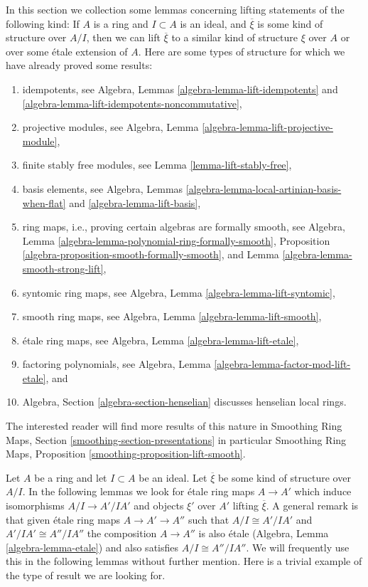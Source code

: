 \noindent
In this section we collection some lemmas concerning lifting
statements of the following kind: If $A$ is a ring and $I \subset A$
is an ideal, and $\overline{\xi}$ is some kind of structure over
$A/I$, then we can lift $\overline{\xi}$ to a similar kind of structure
$\xi$ over $A$ or over some \'etale extension of $A$. Here are some types
of structure for which we have already proved some results:
\begin{enumerate}
\item idempotents, see
Algebra, Lemmas \ref{algebra-lemma-lift-idempotents} and
\ref{algebra-lemma-lift-idempotents-noncommutative},
\item projective modules, see
Algebra, Lemma \ref{algebra-lemma-lift-projective-module},
\item finite stably free modules, see Lemma \ref{lemma-lift-stably-free},
\item basis elements, see
Algebra, Lemmas \ref{algebra-lemma-local-artinian-basis-when-flat} and
\ref{algebra-lemma-lift-basis},
\item ring maps, i.e., proving certain algebras are formally smooth, see
Algebra, Lemma \ref{algebra-lemma-polynomial-ring-formally-smooth},
Proposition \ref{algebra-proposition-smooth-formally-smooth}, and
Lemma \ref{algebra-lemma-smooth-strong-lift},
\item syntomic ring maps, see
Algebra, Lemma \ref{algebra-lemma-lift-syntomic},
\item smooth ring maps, see
Algebra, Lemma \ref{algebra-lemma-lift-smooth},
\item \'etale ring maps, see
Algebra, Lemma \ref{algebra-lemma-lift-etale},
\item factoring polynomials, see
Algebra, Lemma \ref{algebra-lemma-factor-mod-lift-etale}, and
\item Algebra, Section \ref{algebra-section-henselian} discusses henselian
local rings.
\end{enumerate}
The interested reader will find more results of this nature in
Smoothing Ring Maps, Section \ref{smoothing-section-presentations}
in particular
Smoothing Ring Maps, Proposition \ref{smoothing-proposition-lift-smooth}.

\medskip\noindent
Let $A$ be a ring and let $I \subset A$ be an ideal. Let $\overline{\xi}$
be some kind of structure over $A/I$. In the following lemmas we look for
\'etale ring maps $A \to A'$ which induce isomorphisms $A/I \to A'/IA'$
and objects $\xi'$ over $A'$ lifting $\overline{\xi}$. A general remark is
that given \'etale ring maps $A \to A' \to A''$ such that
$A/I \cong A'/IA'$ and $A'/IA' \cong A''/IA''$ the composition
$A \to A''$ is also \'etale (Algebra, Lemma \ref{algebra-lemma-etale})
and also satisfies $A/I \cong A''/IA''$.
We will frequently use this in the following lemmas without further mention.
Here is a trivial example of the type of result we are looking for.

